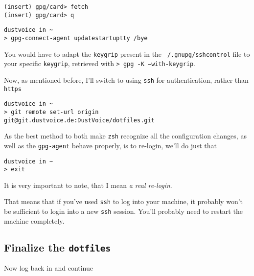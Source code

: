 \documentclass[10pt]{dustdoc}
\begin{document}
\begin{verbatim}
(insert) gpg/card> fetch
(insert) gpg/card> q
\end{verbatim}

\begin{verbatim}
dustvoice in ~
> gpg-connect-agent updatestartuptty /bye
\end{verbatim}


\begin{NOTE}
    You would have to adapt the \texttt{keygrip} present in the \texttt{~/.gnupg/sshcontrol} file to your specific \texttt{keygrip}, retrieved with \texttt{> gpg -K --with-keygrip}.
\end{NOTE}

Now, as mentioned before, I’ll switch to using \texttt{ssh} for authentication, rather than \texttt{https}

\begin{verbatim}
dustvoice in ~
> git remote set-url origin git@git.dustvoice.de:DustVoice/dotfiles.git
\end{verbatim}


As the best method to both make \texttt{zsh} recognize all the configuration changes, as well as the \texttt{gpg-agent} behave properly, is to re-login, we’ll do just that

\begin{verbatim}
dustvoice in ~
> exit
\end{verbatim}


\begin{WARNING}
    It is very important to note, that I mean \emph{a real re-login}.

    That means that if you’ve used \texttt{ssh} to log into your machine, it probably won’t be sufficient to login into a new \texttt{ssh} session.
    You’ll probably need to restart the machine completely.
\end{WARNING}

\subsection{Finalize the \texttt{dotfiles}}%
\label{sec:finalize-the-dotfiles}

Now log back in and continue
\end{document}
